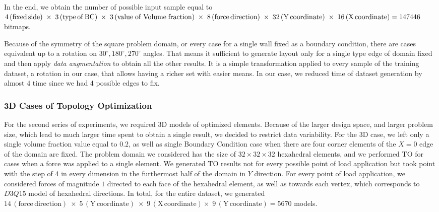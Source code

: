 In the end, we obtain the number of possible input sample equal to $ 4\,\mathrm{(fixed \, side)} \; \times \; 3\,\mathrm{(type \, of \, BC)} \\ \; \times \; 3\,\mathrm{(value \; of \; Volume \; fraction)} \; \times \; 8\,\mathrm{(force \, direction)} \; \times \; 32\,\mathrm{(Y \, coordinate)} \; \times \; 16\,\mathrm{(X \, coordinate)} = 147446 $ bitmaps.
\medskip

Because of the symmetry of the square problem domain, or every case for a single wall fixed as a boundary condition, there are cases equivalent up to a rotation on $ 30^\circ, 180^\circ, 270^\circ $ angles.
That means it sufficient to generate layout only for a single type edge of domain fixed and then apply \emph{data augmentation} to obtain all the other results.
It is a simple transformation applied to every sample of the training dataset, a rotation in our case, that allows having a richer set with easier means.
In our case, we reduced time of dataset generation by almost $4$ time since we had 4 possible edges to fix.
\medskip

\subsubsection{3D Cases of Topology Optimization}

For the second series of experiments, we required 3D models of optimized elements.
Because of the larger design space, and larger problem size, which lead to much larger time spent to obtain a single result, we decided to restrict data variability.
For the 3D case, we left only a single volume fraction value equal to $0.2$, as well as single Boundary Condition case when there are four corner elements of the $ X=0 $ edge of the domain are fixed.
The problem domain we considered has the size of $32 \times 32 \times 32$ hexahedral elements, and we performed TO for cases when a force was applied to a single element. 
We generated TO results not for every possible point of load application but took point with the step of 4 in every dimension in the furthermost half of the domain in $Y$ direction. 
For every point of load application, we considered forces of magnitude $1$ directed to each face of the hexahedral element, as well as towards each vertex, which corresponds to $D3Q15$ model of hexahedral directions. 
In total, for the entire dataset, we generated $ 14\,\mathrm{(force \, direction)} \; \times \; 5\,\mathrm{(Y \, coordinate)} \; \times \; 9\,\mathrm{(X \, coordinate)} \times \; 9\,\mathrm{(Y \, coordinate)} = 5670 $ models.
\medskip

